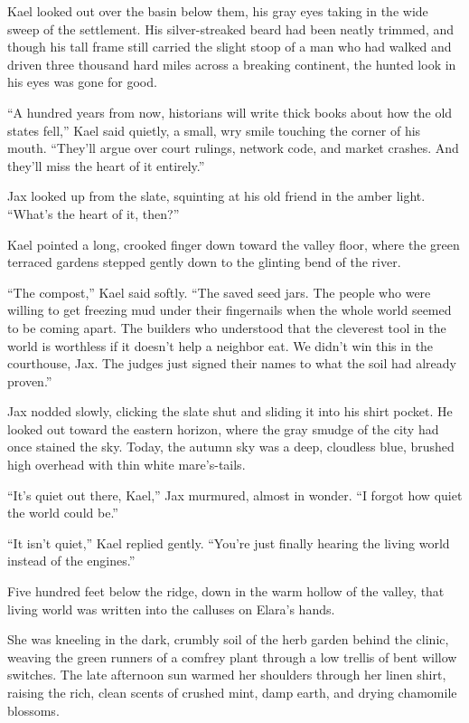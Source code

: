 Kael looked out over the basin below them, his gray eyes taking in the wide sweep of the settlement. His silver-streaked beard had been neatly trimmed, and though his tall frame still carried the slight stoop of a man who had walked and driven three thousand hard miles across a breaking continent, the hunted look in his eyes was gone for good.

``A hundred years from now, historians will write thick books about how the old states fell,'' Kael said quietly, a small, wry smile touching the corner of his mouth. ``They'll argue over court rulings, network code, and market crashes. And they'll miss the heart of it entirely.''

Jax looked up from the slate, squinting at his old friend in the amber light. ``What's the heart of it, then?''

Kael pointed a long, crooked finger down toward the valley floor, where the green terraced gardens stepped gently down to the glinting bend of the river. 

``The compost,'' Kael said softly. ``The saved seed jars. The people who were willing to get freezing mud under their fingernails when the whole world seemed to be coming apart. The builders who understood that the cleverest tool in the world is worthless if it doesn't help a neighbor eat. We didn't win this in the courthouse, Jax. The judges just signed their names to what the soil had already proven.''

Jax nodded slowly, clicking the slate shut and sliding it into his shirt pocket. He looked out toward the eastern horizon, where the gray smudge of the city had once stained the sky. Today, the autumn sky was a deep, cloudless blue, brushed high overhead with thin white mare's-tails.

``It’s quiet out there, Kael,'' Jax murmured, almost in wonder. ``I forgot how quiet the world could be.''

``It isn't quiet,'' Kael replied gently. ``You’re just finally hearing the living world instead of the engines.''

Five hundred feet below the ridge, down in the warm hollow of the valley, that living world was written into the calluses on Elara’s hands.

She was kneeling in the dark, crumbly soil of the herb garden behind the clinic, weaving the green runners of a comfrey plant through a low trellis of bent willow switches. The late afternoon sun warmed her shoulders through her linen shirt, raising the rich, clean scents of crushed mint, damp earth, and drying chamomile blossoms. 

